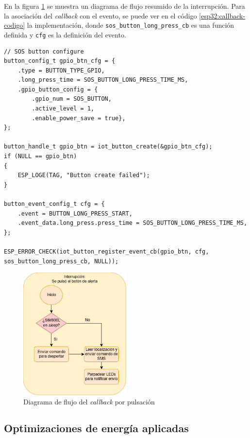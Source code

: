 En la figura \ref{fig:esp32:callback-codigo} se muestra un diagrama de flujo resumido de la interrupción. Para la asociación del \textit{callback} con el evento, se puede ver en el código \ref{esp32:callback-codigo} la implementación, donde \texttt{sos\_button\_long\_press\_cb} es una función definida y \texttt{cfg} es la definición del evento.

\begin{lstlisting}[label=esp32:callback-codigo,caption=Definición del evento y asociación del \textit{callback}]  % Start your code-block
// SOS button configure
button_config_t gpio_btn_cfg = {
    .type = BUTTON_TYPE_GPIO,
    .long_press_time = SOS_BUTTON_LONG_PRESS_TIME_MS,
    .gpio_button_config = {
        .gpio_num = SOS_BUTTON,
        .active_level = 1,
        .enable_power_save = true},
};

button_handle_t gpio_btn = iot_button_create(&gpio_btn_cfg);
if (NULL == gpio_btn)
{
    ESP_LOGE(TAG, "Button create failed");
}

button_event_config_t cfg = {
    .event = BUTTON_LONG_PRESS_START,
    .event_data.long_press.press_time = SOS_BUTTON_LONG_PRESS_TIME_MS,
};

ESP_ERROR_CHECK(iot_button_register_event_cb(gpio_btn, cfg, sos_button_long_press_cb, NULL));

\end{lstlisting}

\begin{figure}[H]
	\centering
	\includegraphics[width=0.5\textwidth]{./Figures/esp32-callback.png}
	\caption{Diagrama de flujo del \textit{callback} por pulsación}
	\label{fig:esp32:callback-codigo}
\end{figure}


\subsection{Optimizaciones de energía aplicadas}

